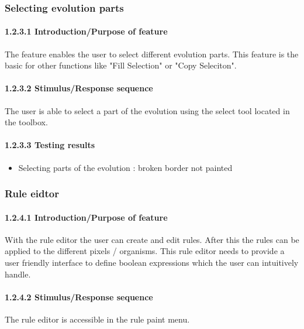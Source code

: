 \documentclass[titlepage,12pt]{scrartcl}
\begin{document}
\subsubsection{Selecting evolution parts}
\paragraph{1.2.3.1 Introduction/Purpose of feature}
The feature enables the user to select different evolution parts. This feature is the basic for other functions like "Fill Selection" or "Copy Seleciton".
\paragraph{1.2.3.2 Stimulus/Response sequence}
The user is able to select a part of the evolution using the select tool located in the toolbox.
\paragraph{1.2.3.3 Testing results}
\begin{itemize}
	\item Selecting parts of the evolution 	: broken border not painted 
\end{itemize}

\subsubsection{Rule eidtor}
\paragraph{1.2.4.1 Introduction/Purpose of feature}
With the rule editor the user can create and edit rules. After this the rules can be applied to the different pixels / organisms. This rule editor needs to provide a user friendly interface to define boolean expressions which the user can intuitively handle.
\paragraph{1.2.4.2 Stimulus/Response sequence}
The rule editor is accessible in the rule paint menu.
\end{document}
